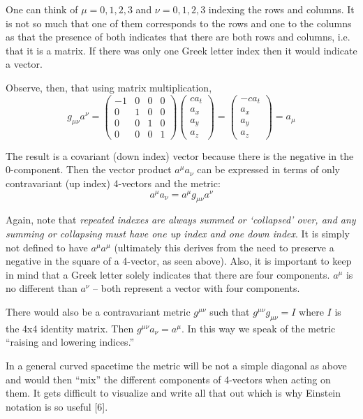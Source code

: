 \documentclass{emulateapj}
\begin{document}
One can think of $\mu=0,1,2,3$ and $\nu=0,1,2,3$ indexing the rows and columns. It is not so much that one of them corresponds to the rows and one to the columns as that the presence of both indicates that there are both rows and columns, i.e. that it is a matrix. If there was only one Greek letter index then it would indicate a vector.

Observe, then, that using matrix multiplication,
\[ g_{\mu\nu}a^{\nu} = \begin{pmatrix}
-1 & 0 & 0 & 0 \\ 
0 & 1 & 0 & 0 \\ 
0 & 0 & 1 & 0 \\ 
0 & 0 & 0 & 1
\end{pmatrix} \begin{pmatrix}
ca_t \\ 
a_x \\ 
a_y \\ 
a_z 
\end{pmatrix} = \begin{pmatrix}
-ca_t \\ 
a_x \\ 
a_y \\ 
a_z 
\end{pmatrix} = a_{\mu} \]

The result is a covariant (down index) vector because there is the negative in the 0-component. Then the vector product $a^{\mu}a_{\nu}$ can be expressed in terms of only contravariant (up index) 4-vectors and the metric:
\[ a^{\mu}a_{\nu}= a^{\mu}g_{\mu\nu}a^{\nu} \]

Again, note that \textit{repeated indexes are always summed or ‘collapsed’ over, and any summing or collapsing must have one up index and one down index}. It is simply not defined to have $a^{\mu}a^{\mu}$ (ultimately this derives from the need to preserve a negative in the square of a 4-vector, as seen above). Also, it is important to keep in mind that a Greek letter solely indicates that there are four components. $a^{\mu}$ is no different than $a^{\nu}$ – both represent a vector with four components.

There would also be a contravariant metric $g^{\mu\nu}$ such that $g^{\mu\nu}g_{\mu\nu}= I$ where $I$ is the 4x4 identity matrix. Then $g^{\mu\nu}a_{\nu}=a^{\mu}$. In this way we speak of the metric “raising and lowering indices.”

In a general curved spacetime the metric will be not a simple diagonal as above and would then “mix” the different components of 4-vectors when acting on them. It gets difficult to visualize and write all that out which is why Einstein notation is so useful [6].
\end{document}
